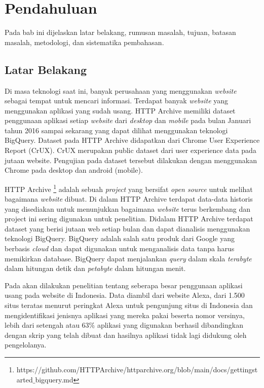 \chapter{Pendahuluan}
\label{chap:intro}
Pada bab ini dijelaskan latar belakang, rumusan masalah, tujuan, batasan masalah, metodologi, dan sistematika pembahasan.
\section{Latar Belakang}
\label{sec:label}
Di masa teknologi saat ini, banyak perusahaan yang menggunakan \textit{website} sebagai tempat untuk mencari informasi. Terdapat banyak \textit{website} yang menggunakan aplikasi yang sudah usang. HTTP Archive memiliki dataset penggunaan aplikasi setiap \textit{website} dari \textit{desktop} dan \textit{mobile} pada bulan Januari tahun 2016 sampai sekarang yang dapat dilihat menggunakan teknologi BigQuery. Dataset pada HTTP Archive didapatkan dari Chrome User Experience Report (CrUX). CrUX merupakan public dataset dari user experience data pada jutaan website. Pengujian pada dataset tersebut dilakukan dengan menggunakan Chrome pada desktop dan android (mobile). 

HTTP Archive \footnote{https://github.com/HTTPArchive/httparchive.org/blob/main/docs/gettingstarted$\_$bigquery.md} adalah sebuah \textit{project} yang bersifat \textit{open source} untuk melihat bagaimana \textit{website} dibuat. Di dalam HTTP Archive terdapat data-data historis yang disediakan untuk menunjukkan bagaimana \textit{website} terus berkembang dan project ini sering digunakan untuk penelitian. Didalam HTTP Archive terdapat dataset yang berisi jutaan web setiap bulan dan dapat dianalisis menggunakan teknologi BigQuery. BigQuery \cite{bqIntroduction} adalah salah satu produk dari Google yang berbasis \textit{cloud} dan dapat digunakan untuk menganalisis data tanpa harus memikirkan database. BigQuery dapat menjalankan \textit{query} dalam skala \textit{terabyte} dalam hitungan detik dan \textit{petabyte} dalam hitungan menit.

Pada \cite{pascal} akan dilakukan penelitian tentang seberapa besar penggunaan aplikasi usang pada website di Indonesia. Data diambil dari website Alexa, dari 1.500 situs teratas menurut peringkat Alexa untuk pengunjung situs di Indonesia dan mengidentifikasi jenisnya aplikasi yang mereka pakai beserta nomor versinya, lebih dari setengah atau 63\% aplikasi yang digunakan berhasil dibandingkan dengan skrip yang telah dibuat dan hasilnya aplikasi tidak lagi didukung oleh pengelolanya.

